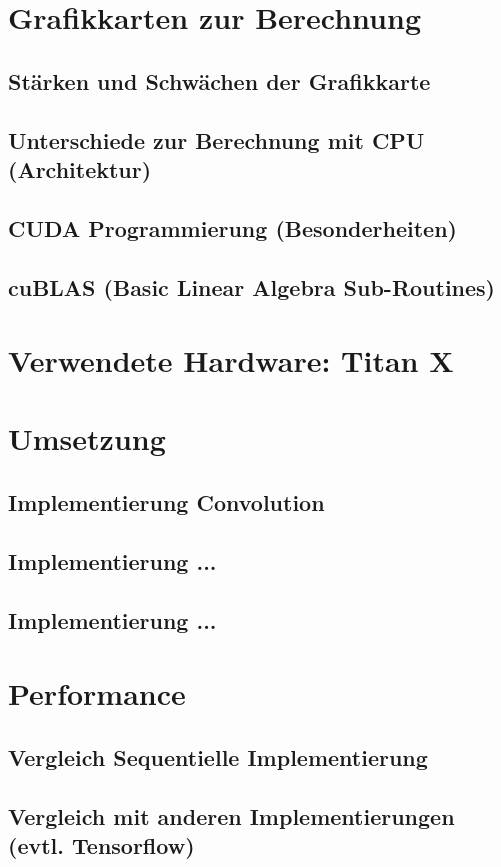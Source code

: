 \documentclass[../main.tex]{subfiles}
\begin{document}
\section{Grafikkarten zur Berechnung}
\subsection{Stärken und Schwächen der Grafikkarte}
\subsection{Unterschiede zur Berechnung mit CPU (Architektur)}
\subsection{CUDA Programmierung (Besonderheiten)}
\subsection{cuBLAS (Basic Linear Algebra Sub-Routines)}
\section{Verwendete Hardware: Titan X}
\section{Umsetzung}
\subsection{Implementierung Convolution}
\subsection{Implementierung ...}
\subsection{Implementierung ...}
\section{Performance}
\subsection{Vergleich Sequentielle Implementierung}
\subsection{Vergleich mit anderen Implementierungen (evtl. Tensorflow)}
\end{document}
